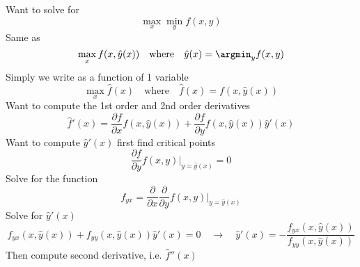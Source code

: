 \documentclass[11pt]{article}
\begin{document}
Want to solve for 
\[
    \max_x \min_y f(x, y)    
\]
Same as 
\[
    \max_x f(x, \hat{y}(x))
    \quad \text{where} \quad 
    \hat{y}(x) = \argmin_y f(x, y)
\]
Simply we write as a function of 1 variable
\[
    \max_x \hat{f}(x)    
    \quad \text{where}\quad 
    \hat{f}(x) = f(x, \hat{y}(x))
\]
Want to compute the 1st order and 2nd order derivatives
\[
    \hat{f}'(x) = \frac{\partial f}{\partial x} f(x, \hat{y}(x)) + \frac{\partial f}{\partial y} f(x, \hat{y}(x)) \hat{y}'(x)
\]
Want to compute $\hat{y}'(x)$ first find critical points
\[
    \frac{\partial f}{\partial y} f(x, y) |_{y=\hat{y}(x)} = 0
\]
Solve for the function
\[
    f_{yx} = \frac{\partial}{\partial x} \frac{\partial}{\partial y} f(x, y) |_{y=\hat{y}(x)}
\]
Solve for $\hat{y}'(x)$ 
\[
    f_{yx}(x, \hat{y}(x)) + f_{yy}(x, \hat{y}(x)) \hat{y}'(x) = 0
    \quad \rightarrow \quad 
    \hat{y}'(x) = - \frac{f_{yx}(x, \hat{y}(x))}{f_{yy}(x, \hat{y}(x))}
\]
Then compute second derivative, i.e.  $\hat{f}''(x)$ 
\end{document}
